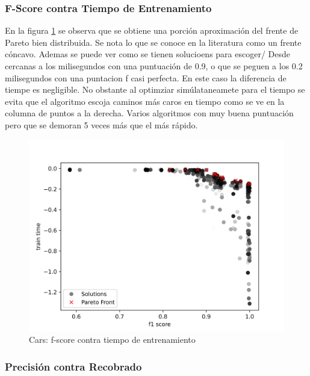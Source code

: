 \subsubsection{F-Score contra Tiempo de Entrenamiento}

En la figura \ref{impl:fig:cars:fscore_vs_time} se observa que se obtiene una porci\'on aproximaci\'on del frente de Pareto bien distribuida. Se nota lo que se conoce en la literatura como un frente c\'oncavo. Ademas se puede ver como se tienen solucioens para escoger/ Desde cercanas a los milisegundos con una puntuaci\'on de 0.9, o que se peguen a los 0.2 milisegundos con una puntacion f casi perfecta. En este caso la diferencia de tiempe es negligible. No obstante al optimziar sim\'ulataneamete para el tiempo se evita que el algoritmo escoja caminos m\'as caros en tiempo como se ve en la columna de puntos a la derecha. Varios algoritmos con muy buena puntuaci\'on pero que se demoran 5 veces m\'as que el m\'as r\'apido.


\begin{figure}[ht]
    \includegraphics[width=\linewidth]{Pictures/cars_fscore_vs_time.jpg}
    \caption{Cars: f-score contra tiempo de entrenamiento}
    \label{impl:fig:cars:fscore_vs_time}
\end{figure}


\subsubsection{Precisi\'on contra Recobrado}

